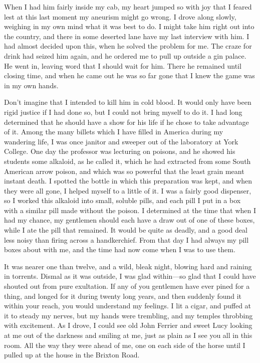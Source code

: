 When I had him fairly inside my cab, my heart jumped so with joy that I feared lest at this last moment my aneurism might go wrong. I drove along slowly, weighing in my own mind what it was best to do. I might take him right out into the country, and there in some deserted lane have my last interview with him. I had almost decided upon this, when he solved the problem for me. The craze for drink had seized him again, and he ordered me to pull up outside a gin palace. He went in, leaving word that I should wait for him. There he remained until closing time, and when he came out he was so far gone that I knew the game was in my own hands.

Don't imagine that I intended to kill him in cold blood. It would only have been rigid justice if I had done so, but I could not bring myself to do it. I had long determined that he should have a show for his life if he chose to take advantage of it. Among the many billets which I have filled in America during my wandering life, I was once janitor and sweeper out of the laboratory at York College. One day the professor was lecturing on poisons, and he showed his students some alkaloid, as he called it, which he had extracted from some South American arrow poison, and which was so powerful that the least grain meant instant death. I spotted the bottle in which this preparation was kept, and when they were all gone, I helped myself to a little of it. I was a fairly good dispenser, so I worked this alkaloid into small, soluble pills, and each pill I put in a box with a similar pill made without the poison. I determined at the time that when I had my chance, my gentlemen should each have a draw out of one of these boxes, while I ate the pill that remained. It would be quite as deadly, and a good deal less noisy than firing across a handkerchief. From that day I had always my pill boxes about with me, and the time had now come when I was to use them.

It was nearer one than twelve, and a wild, bleak night, blowing hard and raining in torrents. Dismal as it was outside, I was glad within—so glad that I could have shouted out from pure exultation. If any of you gentlemen have ever pined for a thing, and longed for it during twenty long years, and then suddenly found it within your reach, you would understand my feelings. I lit a cigar, and puffed at it to steady my nerves, but my hands were trembling, and my temples throbbing with excitement. As I drove, I could see old John Ferrier and sweet Lucy looking at me out of the darkness and smiling at me, just as plain as I see you all in this room. All the way they were ahead of me, one on each side of the horse until I pulled up at the house in the Brixton Road.

